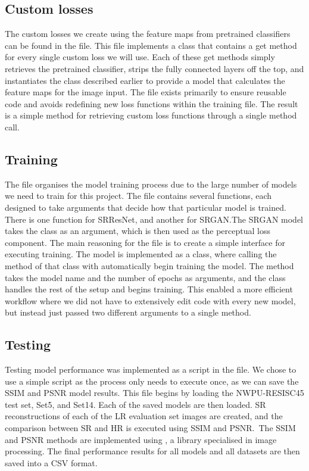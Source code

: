 \subsection{Custom losses}
The custom losses we create using the feature maps from pretrained classifiers can be found in the  file. This file implements a class that contains a get method for every single custom loss we will use. Each of these get methods simply retrieves the pretrained classifier, strips the fully connected layers off the top, and instantiates the  class described earlier to provide a model that calculates the feature maps for the image input. The  file exists primarily to ensure reusable code and avoids redefining new loss functions within the training file. The result is a simple method for retrieving custom loss functions through a single method call.

\subsection{Training}
The  file organises the model training process due to the large number of models we need to train for this project. The file contains several functions, each designed to take arguments that decide how that particular model is trained. There is one function for SRResNet, and another for SRGAN.\@ The SRGAN model takes the  class as an argument, which is then used as the perceptual loss component. The main reasoning for the  file is to create a simple interface for executing training. The model is implemented as a class, where calling the  method of that class with automatically begin training the model. The  method takes the model name and the number of epochs as arguments, and the class handles the rest of the setup and begins training. This enabled a more efficient workflow where we did not have to extensively edit code with every new model, but instead just passed two different arguments to a single method.

\subsection{Testing}
Testing model performance was implemented as a script in the  file. We chose to use a simple script as the process only needs to execute once, as we can save the SSIM and PSNR model results. This file begins by loading the NWPU-RESISC45 test set, Set5, and Set14. Each of the saved models are then loaded. SR reconstructions of each of the LR evaluation set images are created, and the comparison between SR and HR is executed using SSIM and PSNR.\ The SSIM and PSNR methods are implemented using , a  library specialised in image processing. The final performance results for all models and all datasets are then saved into a CSV format.

